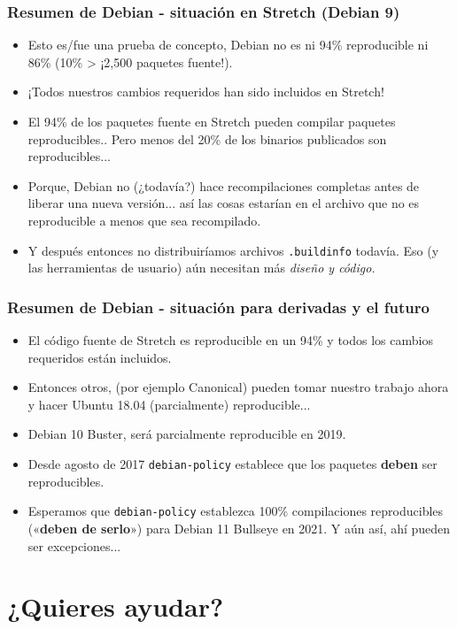 \documentclass[14pt,aspectratio=169]{beamer}
\begin{document}
\begin{frame}
	\frametitle{Resumen de Debian - situación en Stretch (Debian 9)}
 \begin{itemize}
  \item Esto es/fue una prueba de concepto, Debian no es ni 94\% reproducible ni
  86\% (10\% > ¡2,500 paquetes fuente!).
  \item<2-4> ¡Todos nuestros cambios requeridos han sido incluidos en Stretch!
  \item<3-4> El 94\% de los paquetes fuente en Stretch pueden compilar paquetes reproducibles.. Pero menos del 20\% de los binarios publicados son reproducibles...
  \item<3-4> Porque, Debian no (¿todavía?) hace recompilaciones completas antes de
   liberar una nueva versión... así las cosas estarían en el archivo que no es reproducible a menos que sea
   recompilado.
  \item<4> Y después entonces no distribuiríamos archivos \texttt{.buildinfo} todavía.
   Eso (y las herramientas de usuario) aún necesitan más \it{diseño} y código.
 \end{itemize}
\end{frame}

\begin{frame}
	\frametitle{Resumen de Debian - situación para derivadas y el futuro}
 \begin{itemize}
  \item El código fuente de Stretch es reproducible en un 94\% y todos los cambios requeridos están incluidos.
  \item Entonces otros, (por ejemplo Canonical) pueden tomar nuestro trabajo ahora y hacer Ubuntu 18.04
  (parcialmente) reproducible...
  \item<2-4> Debian 10 Buster, será parcialmente reproducible en 2019.
  \item<3-4> Desde agosto de 2017 \texttt{debian-policy} establece que los paquetes \textbf{deben} ser reproducibles.
  \item<4> Esperamos que \texttt{debian-policy} establezca 100\%
	  compilaciones reproducibles («\textbf{deben de serlo}») para Debian 11 Bullseye en 2021. Y aún así, ahí pueden ser excepciones...
 \end{itemize}
\end{frame}

\section{¿Quieres ayudar?}
\end{document}
